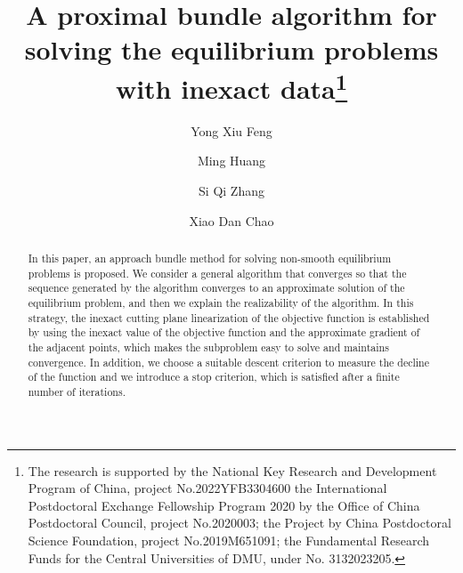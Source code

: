 \documentclass[12pt]{llncs}
\begin{document}
\fi
%
\title{A proximal bundle algorithm for solving the equilibrium problems with inexact 
data\thanks{The research is supported by the National Key Research and Development Program of China, project No.2022YFB3304600 the International Postdoctoral Exchange Fellowship Program 2020 by the Office of China Postdoctoral Council, project No.2020003; the Project by China Postdoctoral Science Foundation, project No.2019M651091; the Fundamental Research Funds for the Central Universities of DMU, under No. 3132023205.}}
\author{Yong Xiu Feng \and Ming Huang \and Si Qi Zhang \and Xiao Dan Chao
  }

\maketitle

\begin{abstract}
 In this paper, an approach bundle method for solving non-smooth equilibrium problems is proposed. We consider a general algorithm that converges so that the sequence generated by the algorithm converges to an approximate solution of the equilibrium problem, and then we explain the realizability of the algorithm. In this strategy, the inexact cutting plane linearization of the objective function is established by using the inexact value of the objective function and the approximate gradient of the adjacent points, which makes the subproblem easy to solve and maintains convergence. In addition, we choose a suitable descent criterion to measure the decline of the function and we introduce a stop criterion, which is satisfied after a finite number of iterations.
 
\end{abstract}
\end{document}
